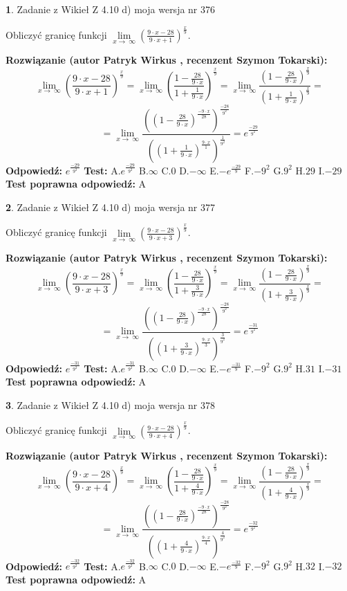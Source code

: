 \documentclass[12pt, a4paper]{article}
\theoremstyle{definition} %
\newtheorem{zad}{}
\newcommand{\zadStart}[1]{\begin{zad}#1\newline}
\newcommand{\zadStop}{\end{zad}}
\newcommand{\rozwStart}[2]{\noindent \textbf{Rozwiązanie (autor #1 , recenzent #2): }\newline}
\newcommand{\rozwStop}{\newline}
\newcommand{\odpStart}{\noindent \textbf{Odpowiedź:}\newline}
\newcommand{\odpStop}{\newline}
\newcommand{\testStart}{\noindent \textbf{Test:}\newline}
\newcommand{\testStop}{\newline}
\newcommand{\kluczStart}{\noindent \textbf{Test poprawna odpowiedź:}\newline}
\newcommand{\kluczStop}{\newline}
\begin{document}
\zadStart{Zadanie z Wikieł Z 4.10 d) moja wersja nr 376}


Obliczyć granicę funkcji  $\lim\limits_{x\to\ \infty}(\frac{9\cdot x-28}{9\cdot x+1})^{\frac{x}{9}}$.
\zadStop
\rozwStart{Patryk Wirkus}{Szymon Tokarski}
$$\lim\limits_{x\to\ \infty}(\frac{9\cdot x-28}{9\cdot x+1})^{\frac{x}{9}} = \lim\limits_{x\to\ \infty}(\frac{1-\frac{28}{9\cdot x}}{1+\frac{1}{9\cdot x}})^{\frac{x}{9}}=\lim\limits_{x\to\ \infty}\frac{(1-\frac{28}{9\cdot x})^{\frac{x}{9}}}{(1+\frac{1}{9\cdot x})^{\frac{x}{9}}}=$$
$$=\lim\limits_{x\to\ \infty}\frac{((1-\frac{28}{9\cdot x})^{\frac{-9\cdot x}{28}})^{\frac{-28}{9^{2}}}}{((1+\frac{1}{9\cdot x})^{\frac{9\cdot x}{1}})^{\frac{1}{9^{2}}}}=e^{\frac{-29}{9^{2}}}$$
\rozwStop
\odpStart
$e^{\frac{-29}{9^{2}}}$
\odpStop
\testStart
A.$e^{\frac{-29}{9^{2}}}$ B.$\infty$ C.$0$ D.$-\infty$ E.$-e^{\frac{-29}{9}}$
F.$-9^{2}$ G.$9^{2}$
H.$29$
I.$-29$
\testStop
\kluczStart
A
\kluczStop



\zadStart{Zadanie z Wikieł Z 4.10 d) moja wersja nr 377}


Obliczyć granicę funkcji  $\lim\limits_{x\to\ \infty}(\frac{9\cdot x-28}{9\cdot x+3})^{\frac{x}{9}}$.
\zadStop
\rozwStart{Patryk Wirkus}{Szymon Tokarski}
$$\lim\limits_{x\to\ \infty}(\frac{9\cdot x-28}{9\cdot x+3})^{\frac{x}{9}} = \lim\limits_{x\to\ \infty}(\frac{1-\frac{28}{9\cdot x}}{1+\frac{3}{9\cdot x}})^{\frac{x}{9}}=\lim\limits_{x\to\ \infty}\frac{(1-\frac{28}{9\cdot x})^{\frac{x}{9}}}{(1+\frac{3}{9\cdot x})^{\frac{x}{9}}}=$$
$$=\lim\limits_{x\to\ \infty}\frac{((1-\frac{28}{9\cdot x})^{\frac{-9\cdot x}{28}})^{\frac{-28}{9^{2}}}}{((1+\frac{3}{9\cdot x})^{\frac{9\cdot x}{3}})^{\frac{3}{9^{2}}}}=e^{\frac{-31}{9^{2}}}$$
\rozwStop
\odpStart
$e^{\frac{-31}{9^{2}}}$
\odpStop
\testStart
A.$e^{\frac{-31}{9^{2}}}$ B.$\infty$ C.$0$ D.$-\infty$ E.$-e^{\frac{-31}{9}}$
F.$-9^{2}$ G.$9^{2}$
H.$31$
I.$-31$
\testStop
\kluczStart
A
\kluczStop



\zadStart{Zadanie z Wikieł Z 4.10 d) moja wersja nr 378}


Obliczyć granicę funkcji  $\lim\limits_{x\to\ \infty}(\frac{9\cdot x-28}{9\cdot x+4})^{\frac{x}{9}}$.
\zadStop
\rozwStart{Patryk Wirkus}{Szymon Tokarski}
$$\lim\limits_{x\to\ \infty}(\frac{9\cdot x-28}{9\cdot x+4})^{\frac{x}{9}} = \lim\limits_{x\to\ \infty}(\frac{1-\frac{28}{9\cdot x}}{1+\frac{4}{9\cdot x}})^{\frac{x}{9}}=\lim\limits_{x\to\ \infty}\frac{(1-\frac{28}{9\cdot x})^{\frac{x}{9}}}{(1+\frac{4}{9\cdot x})^{\frac{x}{9}}}=$$
$$=\lim\limits_{x\to\ \infty}\frac{((1-\frac{28}{9\cdot x})^{\frac{-9\cdot x}{28}})^{\frac{-28}{9^{2}}}}{((1+\frac{4}{9\cdot x})^{\frac{9\cdot x}{4}})^{\frac{4}{9^{2}}}}=e^{\frac{-32}{9^{2}}}$$
\rozwStop
\odpStart
$e^{\frac{-32}{9^{2}}}$
\odpStop
\testStart
A.$e^{\frac{-32}{9^{2}}}$ B.$\infty$ C.$0$ D.$-\infty$ E.$-e^{\frac{-32}{9}}$
F.$-9^{2}$ G.$9^{2}$
H.$32$
I.$-32$
\testStop
\kluczStart
A
\kluczStop
\end{document}
